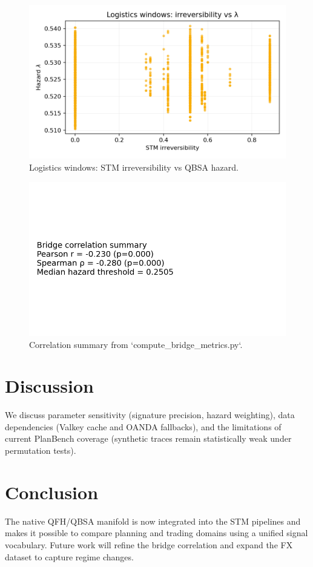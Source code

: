 \documentclass[11pt]{article}
\begin{document}
\begin{figure}[t]
  \centering
  \includegraphics[width=0.75\linewidth]{../figures/fig3_logistics_irreversibility_vs_lambda.png}
  \caption{Logistics windows: STM irreversibility vs QBSA hazard.}
  \label{fig:logistics-irr-lambda}
\end{figure}

\begin{figure}[t]
  \centering
  \includegraphics[width=0.5\linewidth]{../figures/fig4_bridge_correlation_summary.png}
  \caption{Correlation summary from `compute_bridge_metrics.py`.}
  \label{fig:bridge-summary}
\end{figure}

\section{Discussion}
We discuss parameter sensitivity (signature precision, hazard weighting), data dependencies (Valkey cache and OANDA fallbacks), and the limitations of current PlanBench coverage (synthetic traces remain statistically weak under permutation tests).

\section{Conclusion}
The native QFH/QBSA manifold is now integrated into the STM pipelines and makes it possible to compare planning and trading domains using a unified signal vocabulary. Future work will refine the bridge correlation and expand the FX dataset to capture regime changes.
\end{document}
